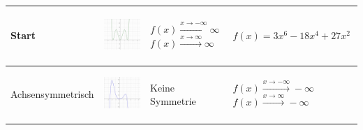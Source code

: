 \documentclass[oneside,openany,headings=optiontotoc,11pt,numbers=noenddot]{scrreprt}
\begin{document}
	\begin{table}
		\begin{tabular}{|M{4.35cm}|M{4.35cm}||M{4.35cm}|M{4.35cm}|}
			\hline
			Start & \begin{center}\includegraphics[scale=0.15]{04-GanzrationaleFunktionen/d1.jpg}\end{center} &  & \(f(x)=3x^6-18x^4+27x^2\) \\
			\hline
			Achsensymmetrisch & \begin{center}\includegraphics[scale=0.15]{04-GanzrationaleFunktionen/e1.jpg}\end{center} & Keine Symmetrie & \\

\end{tabular}
\end{table}
\end{document}
